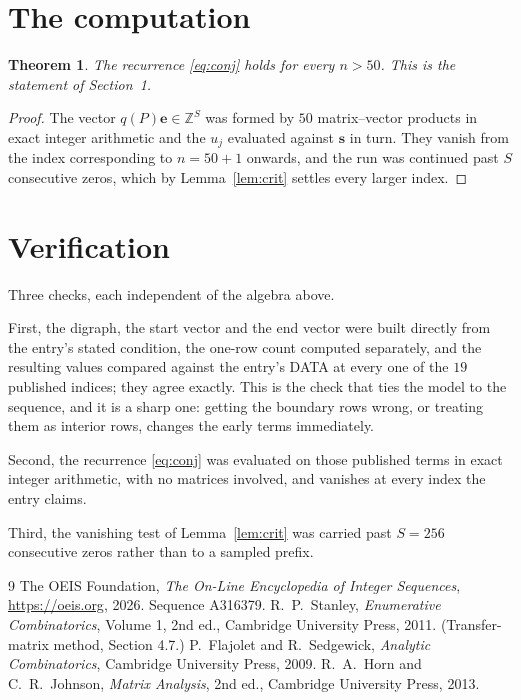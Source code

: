 \documentclass[11pt,a4paper]{article}
\theoremstyle{plain}
\newtheorem{theorem}{Theorem}
\theoremstyle{definition}
\begin{document}
\section{The computation}

\begin{theorem}
The recurrence \eqref{eq:conj} holds for every $n>50$. This is the statement of
Section~1.
\end{theorem}

\begin{proof}
The vector $q(P)\mathbf{e}\in\mathbb{Z}^{S}$ was formed by $50$ matrix--vector
products in exact integer arithmetic and the $u_j$ evaluated against $\mathbf{s}$ in turn.
They vanish from the index corresponding to $n=50+1$ onwards, and the run was continued
past $S$ consecutive zeros, which by Lemma~\ref{lem:crit} settles every larger index.
\end{proof}

\section{Verification}

Three checks, each independent of the algebra above.

First, the digraph, the start vector and the end vector were built directly from the
entry's stated condition, the one-row count computed separately, and the resulting values
compared against the entry's DATA at every one of the $19$ published indices; they
agree exactly. This is the check that ties the model to the sequence, and it is a sharp one:
getting the boundary rows wrong, or treating them as interior rows, changes the early terms
immediately.

Second, the recurrence \eqref{eq:conj} was evaluated on those published terms in exact
integer arithmetic, with no matrices involved, and vanishes at every index the entry claims.

Third, the vanishing test of Lemma~\ref{lem:crit} was carried past $S=256$ consecutive
zeros rather than to a sampled prefix.

\begin{thebibliography}{9}
 The OEIS Foundation, \emph{The On-Line Encyclopedia of Integer
Sequences}, \url{https://oeis.org}, 2026. Sequence A316379.
 R.~P.~Stanley, \emph{Enumerative Combinatorics}, Volume 1, 2nd ed.,
Cambridge University Press, 2011. (Transfer-matrix method, Section 4.7.)
 P.~Flajolet and R.~Sedgewick, \emph{Analytic Combinatorics}, Cambridge
University Press, 2009.
 R.~A.~Horn and C.~R.~Johnson, \emph{Matrix Analysis}, 2nd ed., Cambridge
University Press, 2013.
\end{thebibliography}
\end{document}
